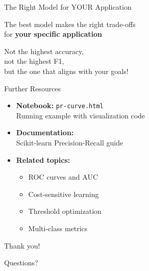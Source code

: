 \documentclass{beamer}
\begin{document}
\begin{frame}{The Right Model for YOUR Application}
\begin{center}
\Large
The best model makes the right trade-offs \\
for \textbf{your specific application}

\vspace{0.5cm}

Not the highest accuracy, \\
not the highest F1, \\
but the one that aligns with your goals!
\end{center}
\end{frame}

\begin{frame}{Further Resources}
\begin{itemize}
    \item \textbf{Notebook:} \texttt{pr-curve.html} \\
          Running example with visualization code

    \item \textbf{Documentation:} \\
          Scikit-learn Precision-Recall guide

    \item \textbf{Related topics:}
    \begin{itemize}
        \item ROC curves and AUC
        \item Cost-sensitive learning
        \item Threshold optimization
        \item Multi-class metrics
    \end{itemize}
\end{itemize}
\end{frame}

\begin{frame}
\begin{center}
\Huge
Thank you!

\vspace{1cm}

\Large
Questions?
\end{center}
\end{frame}
\end{document}

